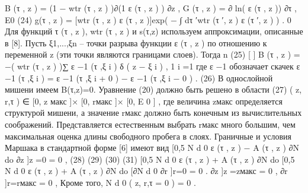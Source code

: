 B (τ , z ) = (1 − wtr (τ , z ) )∂(1 ε (τ , z ) ) ∂z ,
G (τ , z ) = ∂ ln( ε (τ , z )) ∂τ ,
E0
(24)
g(τ , z ) = [wtr (τ , z ) ε (τ , z )]exp( − ∫ dτ ′wtr (τ ′, z ) ε (τ ′, z ) ) .
0
Для функций τ (τ , z ), wtr (τ , z ) и s(τ,z) используем аппроксимации, описанные в [8].
Пусть ξ1,...,ξn – точки разрыва функции ε (τ , z ) по отношению к переменной z (эти
точки являются границами слоев). Тогда
n
(25)
{ }
[
]
B (τ , z ) = −( wtr (τ , z ) )∑ ε −1 (τ ,ξ i ) δ ( z − ξ i ) ,
1
i =1
где ε −1 обозначает скачек
{
}
ε −1 (τ ,ξ i ) = ε −1 (τ ,ξ i + 0 ) − ε −1 (τ ,ξ i − 0 ) .
(26)
В однослойной мишени имеем B(τ,z)=0.
Уравнение (20) должно быть решено в области
(27)
( z, r,τ ) ∈ [0, z макс ]× [0, rмакс ]× [0, E 0 ] ,
где величина zмакс определяется структурой мишени, а значение rмакс должно быть
конечным из вычислительных соображений. Представляется естественным выбрать rмакс
много большим, чем максимальная оценка длины свободного пробега в слоях.
Граничные и условия Маршака в стандартной форме [6] имеют вид
[0,5 N d 0 ε (τ , z ) − A (τ , z ) ∂N do ∂z ]z =0 = 0 ,
(28)
(29)
(30)
(31)
[0,5 N d 0 ε (τ , z ) + A (τ , z ) ∂N do
[0,5 N d 0 ε (τ , z ) + A (τ , z ) ∂N do
[∂N d 0 ∂r ]r=0 = 0 .
∂z ]z =zмакс = 0 ,
∂r ]r=rмакс = 0 ,
Кроме того,
N d 0 ( z, r,τ = 0 ) = 0 .

